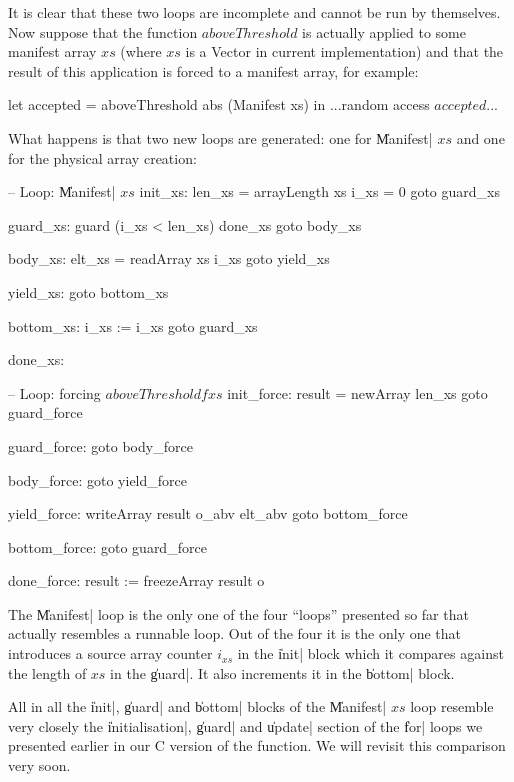 \documentclass[preamble.tex]{subfiles}
\begin{document}
It is clear that these two loops are incomplete and cannot be run by themselves. Now suppose that the function $aboveThreshold$ is actually applied to some manifest array $xs$ (where $xs$ is a Vector in current implementation) and that the result of this application is forced to a manifest array, for example:
\begin{hscode}
let accepted = aboveThreshold abs (Manifest xs)
in  ...random access $accepted$...
\end{hscode}

What happens is that two new loops are generated: one for \|Manifest| $xs$ and one for the physical array creation:

\begin{loopcode}
  -- Loop: \|Manifest| $xs$
  init_xs:
    len_xs = arrayLength xs
    i_xs = 0
    goto guard_xs

  guard_xs:
    guard (i_xs < len_xs) done_xs
    goto body_xs

  body_xs:
    elt_xs = readArray xs i_xs
    goto yield_xs

  yield_xs:
    goto bottom_xs

  bottom_xs:
    i_xs := i_xs
    goto guard_xs

  done_xs:


  -- Loop: forcing $aboveThreshold f xs$
  init_force:
    result = newArray len_xs
    goto guard_force

  guard_force:
    goto body_force

  body_force:
    goto yield_force

  yield_force:
    writeArray result o_abv elt_abv
    goto bottom_force

  bottom_force:
    goto guard_force

  done_force:
    result := freezeArray result o
\end{loopcode}

The \|Manifest| loop is the only one of the four ``loops'' presented so far that actually resembles a runnable loop. Out of the four it is the only one that introduces a source array counter $i_{xs}$ in the \|init| block which it compares against the length of $xs$ in the \|guard|. It also increments it in the \|bottom| block.

All in all the \|init|, \|guard| and \|bottom| blocks of the \|Manifest| $xs$ loop resemble very closely the \|initialisation|, \|guard| and \|update| section of the \|for| loops we presented earlier in our C version of the function. We will revisit this comparison very soon.
\end{document}
